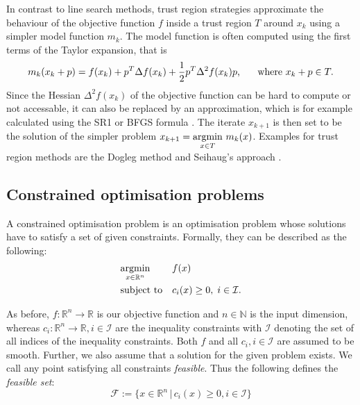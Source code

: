 \indent In contrast to line search methods, trust region strategies approximate the behaviour of the objective function $f$ inside a trust region $T$ around $x_k$ using a simpler model function $m_k$. The model function is often computed using the first terms of the Taylor expansion, that is \[m_k(x_k + p) = f(x_k) + p^T\Delta f(x_k) + \frac{1}{2}p^T\Delta^2 f(x_k) p \text{, \indent where } x_k + p \in T.\] Since the Hessian $\Delta^2 f(x_k)$ of the objective function can be hard to compute or not accessable, it can also be replaced by an approximation, which is for example calculated using the SR1 or BFGS formula \cite{NoceWrig06}. The iterate $x_{k+1}$ is then set to be the solution of the simpler problem $x_{k+1} = \underset{x \in T}{\operatorname*{argmin} }  \,\,m_k(x)$. Examples for trust region methods are the Dogleg method and Seihaug's approach \cite{NoceWrig06}.

\subsection{Constrained optimisation problems}
A constrained optimisation problem is an optimisation problem whose solutions have to satisfy a set of given constraints. Formally, they can be described as the following:\\
\begin{equation}
	\label{constrained_min_problem}
	\begin{aligned}
		& \underset{x \in \mathbb{R}^n}{\operatorname*{argmin}}
		& & f(x) \\
		& \text{subject to}
		& & c_i(x) \geq 0, \; i \in \mathcal{I}.
	\end{aligned}
\end{equation}

As before, $f\colon \mathbb{R}^n\to \mathbb{R}$ is our objective function and $n \in \mathbb{N}$ is the input dimension, whereas $c_i\colon \mathbb{R}^n\to \mathbb{R}, i \in \mathcal{I}$ are the inequality constraints with $\mathcal{I}$ denoting the set of all indices of the inequality constraints. Both $f$ and all $c_i, i \in \mathcal{I}$ are assumed to be smooth. Further, we also assume that a solution for the given problem exists. We call any point satisfying all constraints \textit{feasible}. Thus the following defines the \textit{feasible set}:
\[ \mathcal{F} := \{x \in \mathbb{R}^n \,|\, c_i(x) \geq 0, i\in \mathcal{I} \} \]

